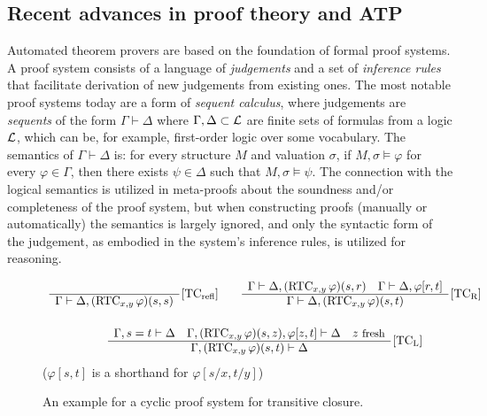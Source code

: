 \subsection{Recent advances in proof theory and ATP}

Automated theorem provers are based on the foundation of formal proof systems.
A proof system consists of a language of \emph{judgements} and a set of \emph{inference rules} that facilitate derivation of new judgements from existing ones.
The most notable proof systems today are a form of \emph{sequent calculus}, where judgements are \emph{sequents} of the form $\Gamma \vdash \Delta$ where $\Gamma,\Delta \subset \mathcal{L}$ are finite sets of formulas from a logic $\mathcal{L}$, which can be, for example, first-order logic over some vocabulary.
The semantics of $\Gamma\vdash\Delta$ is: for every structure $M$ and valuation $\sigma$, if $M,\sigma\models\varphi$ for every $\varphi\in\Gamma$, then there exists $\psi\in\Delta$ such that $M,\sigma\models\psi$.
The connection with the logical semantics is utilized in meta-proofs about the soundness and/or completeness of the proof system,
but when constructing proofs (manually or automatically) the semantics is largely ignored, and only the syntactic form of the judgement, as embodied in the system's inference rules,
is utilized for reasoning.

\begin{figure}
\centering
\renewcommand\arraystretch{1.2}
\[
\begin{array}{c@{\qquad}c}
\begin{array}{c}
~ \\ \hline
\Gamma \vdash \Delta, \RTC{x,y}{\varphi}{s,s}
\end{array}
\,\rulename{TC$_\textrm{refl}$}
%
&
\begin{array}{c}
\Gamma \vdash \Delta, \RTC{x,y}{\varphi}{s,r} \quad
\Gamma \vdash \Delta, \varphi[r,t]            \\ \hline
\Gamma \vdash \Delta, \RTC{x,y}{\varphi}{s,t}
\end{array}
\,\rulename{TC$_\textrm{R}$}
\\[5ex]
\multicolumn{2}{c}{
\begin{array}{c}
\Gamma, s = t \vdash \Delta \quad
\Gamma, \RTC{x,y}{\varphi}{s,z}, \varphi[z,t] \vdash \Delta \quad
z~\textrm{\small fresh}
\\ \hline
\Gamma,\RTC{x,y}{\varphi}{s,t}
	\vdash \Delta
\end{array}
\,\rulename{TC$_\textrm{L}$}
}
\end{array}
\]
({\small $\varphi[s,t]$ is a shorthand for $\varphi[s/x,t/y]$})
\caption{An example for a cyclic proof system for transitive closure.}
\label{b2:tc-cyclic}
\end{figure}


